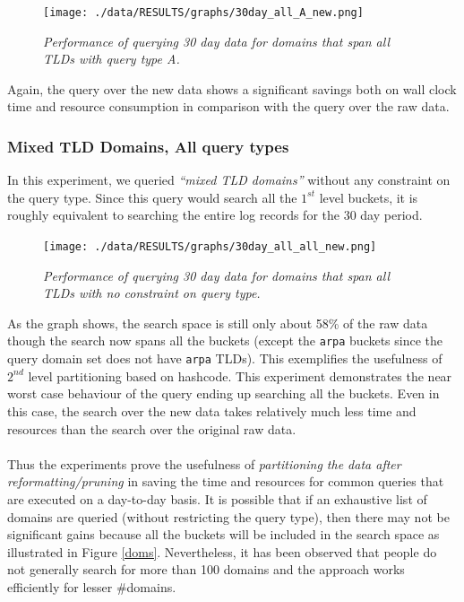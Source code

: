 \documentclass[11pt,a4paper]{article}
\begin{document}
\begin{figure}[H] 
\centering
\texttt{[image: ./data/RESULTS/graphs/30day\_all\_A\_new.png]}
\caption {\textit{Performance of querying 30 day data for domains that span all TLDs with query type A.}}
\label{allafigure}
\end{figure}

\noindent
Again, the query over the new data shows a significant savings both on wall clock time and resource consumption in comparison with the query over the raw data.

\subsubsection{Mixed TLD Domains, All query types}
In this experiment, we queried \textit{``mixed TLD domains''} without any constraint on the query type. Since this query would search all the $1^{st}$ level buckets, it is roughly equivalent to searching the entire log records for the 30 day period.

\begin{figure}[H] 
\centering
\texttt{[image: ./data/RESULTS/graphs/30day\_all\_all\_new.png]}
\caption {\textit{Performance of querying 30 day data for domains that span all TLDs with no constraint on query type.}}
\end{figure}

\noindent
As the graph shows, the search space is still only about 58\% of the raw data though the search now spans all the buckets (except the \texttt{arpa} buckets since the query domain set does not have \texttt{arpa} TLDs). This exemplifies the usefulness of $2^{nd}$ level partitioning based on hashcode. This experiment demonstrates the near worst case behaviour of the query ending up searching all the buckets. Even in this case, the search over the new data takes relatively much less time and resources than the search over the original raw data.
\\\\
Thus the experiments prove the usefulness of \textit{partitioning the data after reformatting/pruning} in saving the time and resources for common queries that are executed on a day-to-day basis. It is possible that if an exhaustive list of domains are queried (without restricting the query type), then there may not be significant gains because all the buckets will be included in the search space as illustrated in Figure \ref{doms}. Nevertheless, it has been observed that people do not generally search for more than 100 domains and the approach works efficiently for lesser \#domains.
\end{document}
